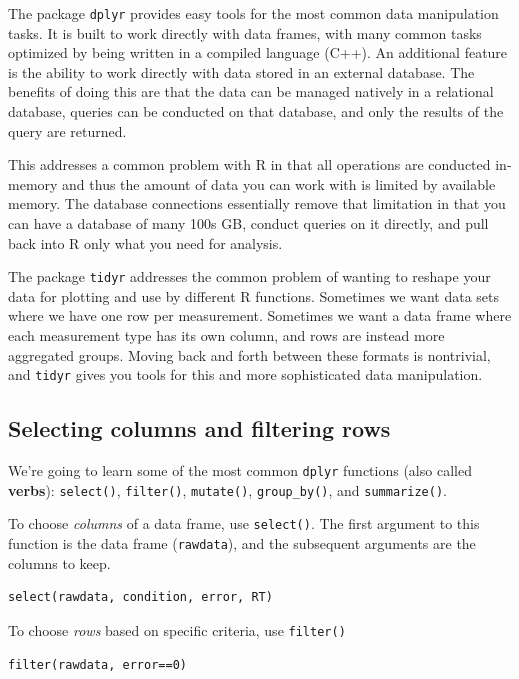 \documentclass[11pt]{article}
\begin{document}
The package \texttt{dplyr} provides easy tools for the most common data manipulation tasks. It is built to work directly with data frames, with many common tasks optimized by being written in a compiled language (C++). An additional feature is the ability to work directly with data stored in an external database. The benefits of doing this are that the data can be managed natively in a relational database, queries can be conducted on that database, and only the results of the query are returned.

This addresses a common problem with R in that all operations are conducted in-memory and thus the amount of data you can work with is limited by available memory. The database connections essentially remove that limitation in that you can have a database of many 100s GB, conduct queries on it directly, and pull back into R only what you need for analysis.

The package \texttt{tidyr} addresses the common problem of wanting to reshape your data for plotting and use by different R functions. Sometimes we want data sets where we have one row per measurement. Sometimes we want a data frame where each measurement type has its own column, and rows are instead more aggregated groups. Moving back and forth between these formats is nontrivial, and \texttt{tidyr} gives you tools for this and more sophisticated data manipulation.

\subsection*{Selecting columns and filtering rows}
\label{sec-3-1}

We're going to learn some of the most common \texttt{dplyr} functions (also called \textbf{verbs}): \texttt{select()}, \texttt{filter()}, \texttt{mutate()}, \texttt{group\_by()}, and \texttt{summarize()}. 

To choose \emph{columns} of a data frame, use \texttt{select()}. The first argument to this function is the data frame (\texttt{rawdata}), and the subsequent arguments are the columns to keep.

\begin{verbatim}
select(rawdata, condition, error, RT)
\end{verbatim}

To choose \emph{rows} based on specific criteria, use \texttt{filter()}

\begin{verbatim}
filter(rawdata, error==0)
\end{verbatim}
\end{document}
